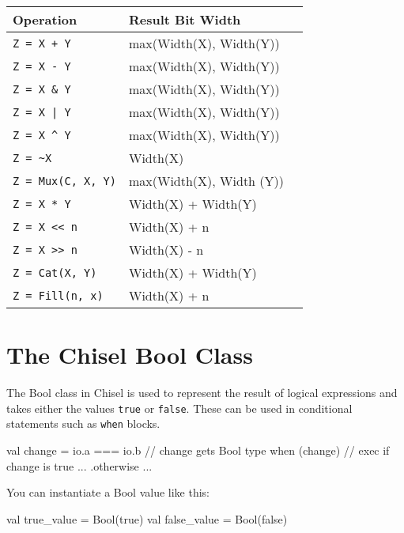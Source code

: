 \begin{center}
\begin{tabular}{| l | l | l | }
\hline
Operation & Result Bit Width \\ \hline
\verb!Z = X + Y! & max(Width(X), Width(Y))  \\ \hline
\verb+Z = X - Y+ & max(Width(X), Width(Y)) \\ \hline
\verb+Z = X & Y+ & max(Width(X), Width(Y)) \\ \hline
\verb+Z = X | Y+ & max(Width(X), Width(Y)) \\ \hline
\verb+Z = X ^ Y+ & max(Width(X), Width(Y)) \\ \hline
\verb+Z = ~X+ & Width(X) \\ \hline
\verb+Z = Mux(C, X, Y)+ & max(Width(X), Width (Y)) \\ \hline
\verb+Z = X * Y+ & Width(X) + Width(Y) \\ \hline
\verb+Z = X << n+ & Width(X) + n \\ \hline
\verb+Z = X >> n+ & Width(X) - n \\ \hline
\verb+Z = Cat(X, Y)+ & Width(X) + Width(Y) \\ \hline
\verb+Z = Fill(n, x)+ & Width(X) + n \\ \hline
\end{tabular}
\end{center}

\section{The Chisel Bool Class}

The Bool class in Chisel is used to represent the result of logical expressions and takes either the values \verb+true+ or \verb+false+. These can be used in conditional statements such as \verb+when+ blocks.

\begin{scala}
val change = io.a === io.b // change gets Bool type
when (change) {            // exec if change is true
  ...
} .otherwise {
  ...
}
\end{scala}

You can instantiate a Bool value like this:

\begin{scala}
val true_value  = Bool(true)
val false_value = Bool(false)
\end{scala}


